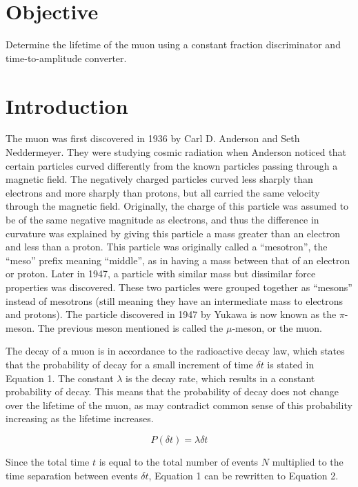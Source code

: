 \documentclass[%
 aip,
 amsmath,amssymb,
 reprint,%
floatfix,
]{revtex4-1}
\begin{document}
\onecolumngrid

\section{\label{sec:level1}Objective}

Determine the lifetime of the muon using a constant fraction discriminator and time-to-amplitude converter.

\section{\label{sec:level2}Introduction}

The muon was first discovered in 1936 by Carl D. Anderson and Seth Neddermeyer. They were studying cosmic radiation when Anderson noticed that certain particles curved differently from the known particles passing through a magnetic field. The negatively charged particles curved less sharply than electrons and more sharply than protons, but all carried the same velocity through the magnetic field. Originally, the charge of this particle was assumed to be of the same negative magnitude as electrons, and thus the difference in curvature was explained by giving this particle a mass greater than an electron and less than a proton. This particle was originally called a “mesotron”, the “meso” prefix meaning “middle”, as in having a mass between that of an electron or proton. Later in 1947, a particle with similar mass but dissimilar force properties was discovered. These two particles were grouped together as “mesons” instead of mesotrons (still meaning they have an intermediate mass to electrons and protons). The particle discovered in 1947 by Yukawa is now known as the $\pi$-meson. The previous meson mentioned is called the $\mu$-meson, or the muon.

The decay of a muon is in accordance to the radioactive decay law, which states that the probability of decay for a small increment of time $\delta t$ is stated in Equation 1. The constant $\lambda$ is the decay rate, which results in a constant probability of decay. This means that the probability of decay does not change over the lifetime of the muon, as may contradict common sense of this probability increasing as the lifetime increases.

\begin{equation}
	P(\delta t) = \lambda \delta t
\end{equation}

Since the total time $t$ is equal to the total number of events $N$ multiplied to the time separation between events $\delta t$, Equation 1 can be rewritten to Equation 2.
\end{document}
